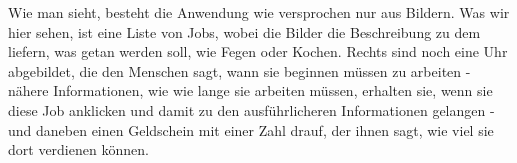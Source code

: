 Wie man sieht, besteht die Anwendung wie versprochen nur aus Bildern. Was wir hier sehen, ist eine Liste von Jobs, wobei die Bilder die Beschreibung zu dem liefern, was getan werden soll, wie Fegen oder Kochen. Rechts sind noch eine Uhr abgebildet, die den Menschen sagt, wann sie beginnen müssen zu arbeiten - nähere Informationen, wie wie lange sie arbeiten müssen, erhalten sie, wenn sie diese Job anklicken und damit zu den ausführlicheren Informationen gelangen - und daneben einen Geldschein mit einer Zahl drauf, der ihnen sagt, wie viel sie dort verdienen können.
 

